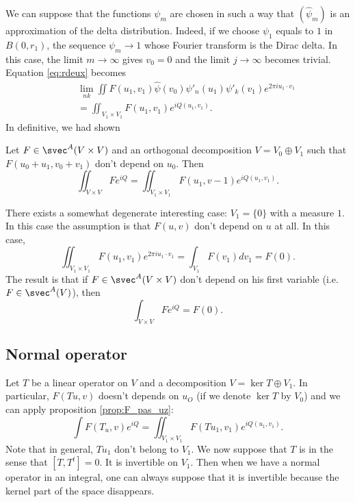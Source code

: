 We can suppose that the functions $\psi_m$ are chosen in such a way that $(\hat\psi_m)$ is an approximation of the delta distribution. Indeed, if we choose $\psi_1$ equals to $1$ in $B(0,r_1)$, the sequence $\psi_m\to 1$ whose Fourier transform is the Dirac delta. In this case, the limit $m\to\infty$ gives $v_0=0$ and the limit $j\to \infty$ becomes trivial. Equation \eqref{eq:rdeux} becomes
\begin{equation}
\begin{split}
\quad&\lim_{nk}\iint F(u_1,v_1)\hat\psi(v_0)\psi'_n(u_1)\psi'_k(v_1)e^{2\pi i u_1\cdot v_1}\\
     &=\iint_{V_1\times V_1}F(u_1,v_1)e^{iQ(u_1,v_1)}.
\end{split}
\end{equation}
In definitive, we had shown 

\begin{proposition} \label{prop:F_pas_uz}
Let $F\in\svec^A(V\times V)$ and an orthogonal decomposition $V=V_0\oplus V_1$ such that $F(u_0+u_1,v_0+v_1)$ don't depend on $u_0$. Then
\[ 
  \iint_{V\times V}Fe^{iQ}=\iint_{V_1\times V_1}F(u_1,v-1)e^{iQ(u_1,v_1)}.
\]

\end{proposition}


There exists a somewhat degenerate interesting case: $V_1=\{ 0 \}$ with a measure $1$. In this case the assumption is that $F(u,v)$ don't depend on $u$ at all. In this case,
\[ 
  \iint_{V_1\times V_1}F(u_1,v_1)e^{2\pi i u_1\cdot v_1}=\int_{V_1}F(v_1)dv_1=F(0).
\]
The result is that if $F\in\svec^A(V\times V)$ don't depend on his first variable (i.e. $F\in\svec^A(V)$), then
\[ 
  \int_{V\times V}Fe^{iQ}=F(0).
\]

 
\subsection{Normal operator}

Let $T$ be a linear operator on $V$ and a decomposition $V=\ker T\oplus V_1$. In particular, $F(Tu,v)$  doesn't depends on $u_O$ (if we denote $\ker T$ by $V_0$) and we can apply proposition \ref{prop:F_pas_uz}:
\[ 
  \int F(T_u,v)e^{iQ}=\iint_{V_1\times V_1}F(Tu_1,v_1)e^{iQ(u_1,v_1)}.
\]
Note that in general, $Tu_1$ don't belong to $V_1$. We now suppose that $T$ is  in the sense that $[T,T^t]=0$. It is invertible on $V_1$. Then when we have a normal operator in an integral, one can always suppose that it is invertible because the kernel part of the space disappears.

